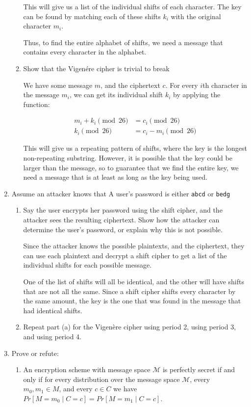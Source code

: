 \documentclass{article}
\begin{document}
\begin{enumerate}
\begin{enumerate}
        This will give us a list of the individual shifts of each character. The
        key can be found by matching each of these shifts $k_i$ with the original
        character $m_i$.

        Thus, to find the entire alphabet of shifts, we need a message that
        contains every character in the alphabet.
      \item Show that the Vigen\'ere cipher is trivial to break

        We have some message $m$, and the ciphertext $c$. For every $i$th
        character in the message $m_i$, we can get its individual shift $k_i$ by
        applying the function:

        \begin{align*}
          m_i + k_i \pmod{26} &= c_i \pmod{26}\\
          k_i \pmod{26} &= c_i - m_i \pmod{26}
        \end{align*}

        This will give us a repeating pattern of shifts, where the key is the
        longest non-repeating substring. However, it is possible that the key
        could be larger than the message, so to guarantee that we find the
        entire key, we need a message that is at least as long as the key being
        used.
    \end{enumerate}

  \item Assume an attacker knows that A user's password is either
    \verb|abcd| or \verb|bedg|
    \begin{enumerate}
      \item Say the user encrypts her password using the shift cipher, and the 
        attacker sees the resulting ciphertext. Show how the attacker can 
        determine the user’s password, or explain why this is not possible.

        Since the attacker knows the possible plaintexts, and the ciphertext,
        they can use each plaintext and decrypt a shift cipher to get a list of
        the individual shifts for each possible message.

        One of the list of shifts will all be identical, and the other will have
        shifts that are not all the same. Since a shift cipher shifts every
        character by the same amount, the key is the one that was found in the
        message that had identical shifts.

      \item Repeat part (a) for the Vigen\`ere cipher using period 2, using 
        period 3, and using period 4.
    \end{enumerate}
  \item Prove or refute:
    \begin{enumerate}
      \item An encryption scheme with message space $\mathcal{M}$ is perfectly
        secret if and only if for every distribution over the message space 
        $\mathcal{M}$, every $m_0, m_1 \in M$, and every $c \in C$ we have 
        $Pr\left[M = m_0 \mid C = c\right] = Pr\left[M = m_1 \mid C = c\right]$.


\end{enumerate}
\end{enumerate}
\end{document}
